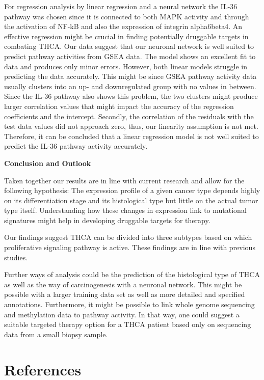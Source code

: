 \documentclass[
  11pt,
  parskip,
  oneside]{scrreprt}
\begin{document}
For regression analysis by linear regression and a neural network the
IL-36 pathway was chosen since it is connected to both MAPK activity and
through the activation of NF-kB and also the expression of integrin
alpha6beta4. An effective regression might be crucial in finding
potentially druggable targets in combating THCA. Our data suggest that
our neuronal network is well suited to predict pathway activities from
GSEA data. The model shows an excellent fit to data and produces only
minor errors. However, both linear models struggle in predicting the
data accurately. This might be since GSEA pathway activity data usually
clusters into an up- and downregulated group with no values in between.
Since the IL-36 pathway also shows this problem, the two clusters might
produce larger correlation values that might impact the accuracy of the
regression coefficients and the intercept. Secondly, the correlation of
the residuals with the test data values did not approach zero, thus, our
linearity assumption is not met. Therefore, it can be concluded that a
linear regression model is not well suited to predict the IL-36 pathway
activity accurately.

\textbf{Conclusion and Outlook}

Taken together our results are in line with current research and allow
for the following hypothesis: The expression profile of a given cancer
type depends highly on its differentiation stage and its histological
type but little on the actual tumor type itself. Understanding how these
changes in expression link to mutational signatures might help in
developing druggable targets for therapy.

Our findings suggest THCA can be divided into three subtypes based on
which proliferative signaling pathway is active. These findings are in
line with previous studies.

Further ways of analysis could be the prediction of the histological
type of THCA as well as the way of carcinogenesis with a neuronal
network. This might be possible with a larger training data set as well
as more detailed and specified annotations. Furthermore, it might be
possible to link whole genome sequencing and methylation data to pathway
activity. In that way, one could suggest a suitable targeted therapy
option for a THCA patient based only on sequencing data from a small
biopsy sample.

\clearpage

\hypertarget{references}{%
\chapter{References}\label{references}}
\end{document}
